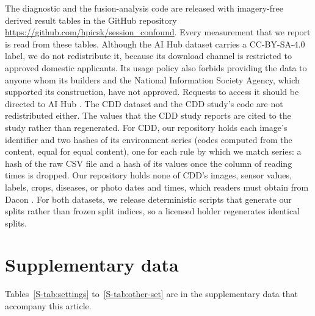 \documentclass[preprint,12pt,authoryear,nopreprintline]{elsarticle}
\begin{document}
The diagnostic and the fusion-analysis code are released with imagery-free
derived result tables in the GitHub repository
\url{https://github.com/hpicsk/session_confound}. Every measurement that we report
is read from these tables. Although the AI Hub dataset carries a
CC-BY-SA-4.0 label, we do not redistribute it, because its download channel is
restricted to approved domestic applicants. Its usage policy also forbids providing
the data to anyone whom its builders and the National Information Society Agency,
which supported its construction, have not approved.
Requests to access it should be directed to AI Hub \citep{aihub2023subtropical}.
The CDD dataset and the CDD study's code are not redistributed either. The values
that the CDD study reports are cited to the study rather than regenerated. For CDD,
our repository holds each image's identifier and two hashes of its environment series
(codes computed from the content, equal for equal content), one for each rule by which we match series: a hash of the raw CSV file and a hash of
its values once the column of reading times is dropped. Our repository holds none of CDD's images, sensor values, labels, crops, diseases, or photo dates and times,
which readers must obtain from Dacon \citep{dacon2021cropdisease}. For
both datasets, we release deterministic scripts that generate our splits rather
than frozen split indices, so a licensed holder regenerates identical splits.

\section*{Supplementary data}

Tables~\ref{S-tab:settings} to~\ref{S-tab:other-set} are in the supplementary data that
accompany this article.



\end{document}
